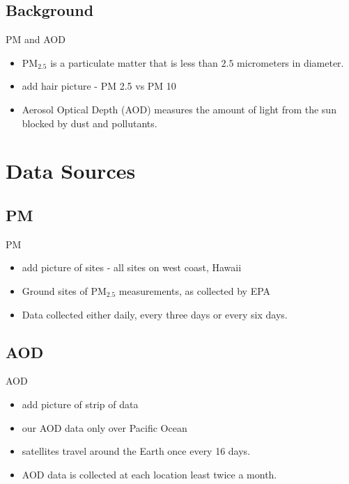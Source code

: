 \documentclass[notheorems,envcountsect,allowframebreaks,xcolor=svgnames,8pt]{beamer}
\begin{document}
\subsection*{Background}
\begin{frame}{PM and AOD}
\begin{itemize}

\item PM$_{2.5}$ is a particulate matter that is less than $2.5$ micrometers in diameter.
\item add hair picture - PM 2.5 vs PM 10
\item Aerosol Optical Depth (AOD) measures the amount of light from the sun blocked by dust and pollutants.

\end{itemize}
\end{frame}

\section*{Data Sources}
\subsection*{PM}
\begin{frame}{PM}
\begin{itemize}	
\item add picture of sites - all sites on west coast, Hawaii
\item Ground sites of PM$_{2.5}$ measurements, as collected by EPA
\item Data collected either daily, every three days or every six days.
\end{itemize}	
\end{frame}
\subsection*{AOD}
\begin{frame}{AOD}
\begin{itemize}	
\item add picture of strip of data
\item our AOD data only over Pacific Ocean
\item satellites travel around the Earth once every 16 days.
\item AOD data is collected at each location least twice a month.
\end{itemize}		
\end{frame}
\end{document}
